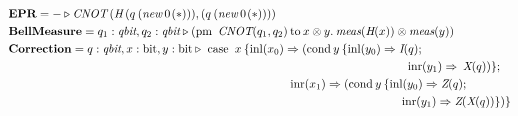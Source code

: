 \begin{align*}
  \hspace{-28pt} &\textbf{EPR} =  - \triangleright  \textit{CNOT} \hspace{2pt} (\textit{H}\hspace{2pt} (q  \hspace{2pt}    ( \textit{new}   \hspace{2pt}  0 \hspace{1pt}(*))),(q  \hspace{2pt}   ( \textit{new}   \hspace{2pt}  0 \hspace{1pt}(*))))  \\ 
      \hspace{-28pt}
      &\textbf{BellMeasure} =  q_{1}: \textit{qbit}, q_{2}: \textit{qbit}  \triangleright  (\text{pm}  \hspace{5pt} \textit{CNOT} (q_{1},q_{2})  \hspace{2pt}  \text{to} \hspace{2pt} x \otimes y.  \hspace{2pt}  \textit{meas} (\textit{H} (x)) \otimes \textit{meas} (y) ) \\
      \hspace{-28pt}
      &\textbf{Correction}= q: \textit{qbit}, x: \text{bit},  y: \text{bit} \triangleright  \text{ case }\hspace{2pt} x  \hspace{2pt}  \{\text{inl} (x_{0}) \Rightarrow  (\text{cond}\hspace{2pt} y  \hspace{2pt}  \{\text{inl} (y_{0})  \Rightarrow{}  \textit{I}(q); \\
      \hspace{-28pt}
      & \hspace{335pt} \hspace{5pt} \text{inr} (y_{1}) \Rightarrow  \hspace{2pt}   \textit{X} (q))\} ; \\
      & \hspace{240pt}\text{inr} (x_{1})  \Rightarrow  (\text{cond}\hspace{2pt} y  \hspace{2pt}  \{\text{inl} (y_{0})  \Rightarrow   \textit{Z}(q);  \\
      \hspace{-28pt}
      &\hspace{335pt} \text{inr} (y_{1}) \Rightarrow{} \textit{Z} (\textit{X}(q)) \})\}
 \end{align*}


